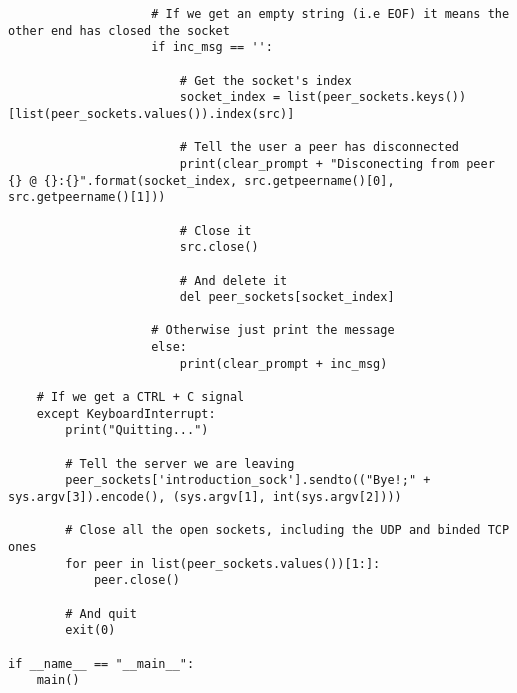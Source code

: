 \documentclass[landscape]{article}
\begin{document}
\begin{verbatim}
                    # If we get an empty string (i.e EOF) it means the other end has closed the socket
                    if inc_msg == '':

                        # Get the socket's index
                        socket_index = list(peer_sockets.keys())[list(peer_sockets.values()).index(src)]

                        # Tell the user a peer has disconnected
                        print(clear_prompt + "Disconecting from peer {} @ {}:{}".format(socket_index, src.getpeername()[0], src.getpeername()[1]))

                        # Close it
                        src.close()

                        # And delete it
                        del peer_sockets[socket_index]

                    # Otherwise just print the message
                    else:
                        print(clear_prompt + inc_msg)

    # If we get a CTRL + C signal
    except KeyboardInterrupt:
        print("Quitting...")

        # Tell the server we are leaving
        peer_sockets['introduction_sock'].sendto(("Bye!;" + sys.argv[3]).encode(), (sys.argv[1], int(sys.argv[2])))

        # Close all the open sockets, including the UDP and binded TCP ones
        for peer in list(peer_sockets.values())[1:]:
            peer.close()

        # And quit
        exit(0)

if __name__ == "__main__":
    main()
            \end{verbatim}
\end{document}
